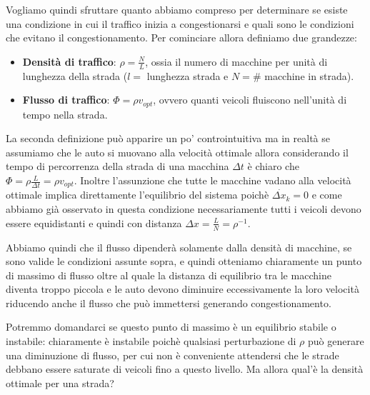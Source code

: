 Vogliamo quindi sfruttare quanto abbiamo compreso per determinare se esiste una condizione in cui il traffico inizia a congestionarsi e quali sono le condizioni che evitano il congestionamento. Per cominciare allora definiamo due grandezze:
\begin{itemize}
	\item \textbf{Densità di traffico}: $\rho = \frac{N}{L}$, ossia il numero di macchine per unità di lunghezza della strada ($l=$ lunghezza strada e $N=\#$ macchine in strada).
	\item \textbf{Flusso di traffico}: $\Phi=\rho v_{opt}$, ovvero quanti veicoli fluiscono nell'unità di tempo nella strada.
\end{itemize}
La seconda definizione può apparire un po' controintuitiva ma in realtà se assumiamo che le auto si muovano alla velocità ottimale allora considerando il tempo di percorrenza della strada di una macchina $\Delta t$ è chiaro che $\Phi=\rho \frac{L}{\Delta t}=\rho v_{opt}$. Inoltre l'assunzione che tutte le macchine vadano alla velocità ottimale implica direttamente l'equilibrio del sistema poichè $\dot{\Delta x_k}=0$ e come abbiamo già osservato in questa condizione necessariamente tutti i veicoli devono essere equidistanti e quindi con distanza $\Delta x=\frac{L}{N}=\rho^{-1}$.
\begin{multicols}{2}

Abbiamo quindi che il flusso dipenderà solamente dalla densità di macchine, se sono valide le condizioni assunte sopra, e quindi otteniamo chiaramente un punto di massimo di flusso oltre al quale la distanza di equilibrio tra le macchine diventa troppo piccola e le auto devono diminuire eccessivamente la loro velocità riducendo anche il flusso che può immettersi generando congestionamento.


\end{multicols}
Potremmo domandarci se questo punto di massimo è un equilibrio stabile o instabile: chiaramente è instabile poichè qualsiasi perturbazione di $\rho$ può generare una diminuzione di flusso, per cui non è conveniente attendersi che le strade debbano essere saturate di veicoli fino a questo livello. Ma allora qual'è la densità ottimale per una strada?\\

